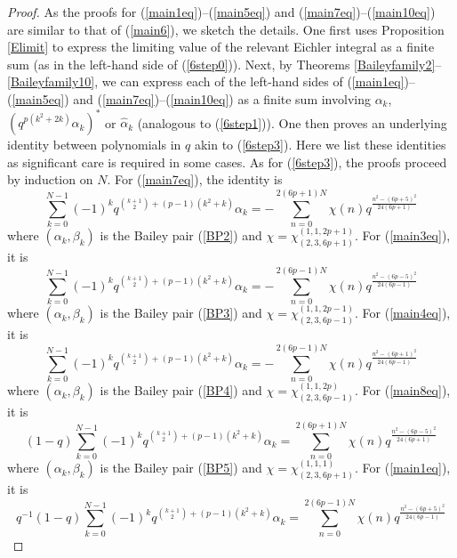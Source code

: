 \documentclass[11pt,reqno]{amsart}
\theoremstyle{definition}
\numberwithin{equation}{section}
\renewcommand{\=}{\;=\;}
\begin{document}
\begin{proof}
As the proofs for (\ref{main1eq})--(\ref{main5eq}) and (\ref{main7eq})--(\ref{main10eq}) are similar to that of (\ref{main6}), we sketch the details. One first uses Proposition \ref{Elimit} to express the limiting value of the relevant Eichler integral as a finite sum (as in the left-hand side of (\ref{6step0})). Next, by Theorems \ref{Baileyfamily2}--\ref{Baileyfamily10}, we can express each of the left-hand sides of (\ref{main1eq})--(\ref{main5eq}) and (\ref{main7eq})--(\ref{main10eq}) as a finite sum involving $\alpha_k$, $(q^{p(k^2 + 2k)} \alpha_k)^{*}$ or $\widehat{\alpha}_{k}$ (analogous to (\ref{6step1})). One then proves an underlying identity between polynomials in $q$ akin to (\ref{6step3}). Here we list these identities as significant care is required in some cases. As for (\ref{6step3}), the proofs proceed by induction on $N$. For (\ref{main7eq}), the identity is
\begin{equation} \label{main7poly}
\sum_{k=0}^{N-1} (-1)^k q^{\binom{k+1}{2} + (p-1)(k^2 + k)} \alpha_k = -\sum_{n=0}^{2(6p+1)N} \chi(n) q^{\frac{n^2 - (6p+5)^2}{24(6p+1)}}
\end{equation}
where $(\alpha_k, \beta_k)$ is the Bailey pair (\ref{BP2}) and $\chi=\chi_{(2,3,6p+1)}^{(1,1,2p+1)}$. For (\ref{main3eq}), it is
\begin{equation} \label{main3poly}
\sum_{k=0}^{N-1} (-1)^k q^{\binom{k+1}{2} + (p-1)(k^2 + k)} \alpha_k = -\sum_{n=0}^{2(6p-1)N} \chi(n) q^{\frac{n^2 - (6p-5)^2}{24(6p-1)}}
\end{equation}
where $(\alpha_k, \beta_k)$ is the Bailey pair (\ref{BP3}) and $\chi=\chi_{(2,3,6p-1)}^{(1,1,2p-1)}$. For (\ref{main4eq}), it is
\begin{equation} \label{main4poly}
\sum_{k=0}^{N-1} (-1)^k q^{\binom{k+1}{2} + (p-1)(k^2 + k)} \alpha_k = -\sum_{n=0}^{2(6p-1)N} \chi(n) q^{\frac{n^2 - (6p+1)^2}{24(6p-1)}}
\end{equation}
where $(\alpha_k, \beta_k)$ is the Bailey pair (\ref{BP4}) and $\chi=\chi_{(2,3,6p-1)}^{(1,1,2p)}$. For (\ref{main8eq}), it is
\begin{equation} \label{Hp}
(1-q) \sum_{k=0}^{N-1} (-1)^k q^{\binom{k+1}{2} + (p-1)(k^2 +k)} \alpha_k = \sum_{n=0}^{2(6p+1)N} \chi(n) q^{\frac{n^2 - (6p - 5)^2}{24(6p+1)}}
\end{equation}
where $(\alpha_k, \beta_k)$ is the Bailey pair (\ref{BP5}) and $\chi=\chi_{(2,3,6p+1)}^{(1,1,1)}$. For (\ref{main1eq}), it is
\begin{equation} \label{H1p}
q^{-1}(1-q) \sum_{k=0}^{N-1} (-1)^k q^{\binom{k+1}{2} + (p-1)(k^2 + k)} \alpha_k = \sum_{n=0}^{2(6p-1)N} \chi(n) q^{\frac{n^2 - (6p+5)^2}{24(6p-1)}}

\end{equation}
\end{proof}
\end{document}
